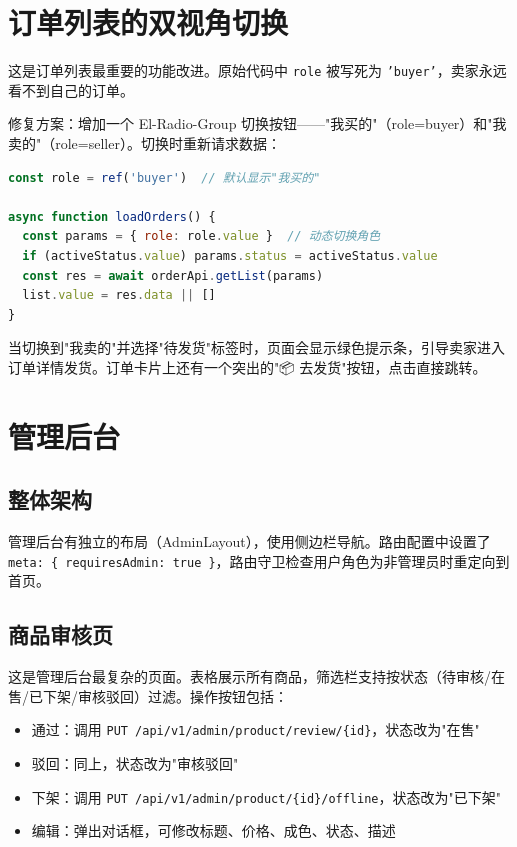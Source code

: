 \documentclass[12pt,a4paper]{ctexart}
\begin{document}
\section{订单列表的双视角切换}

这是订单列表最重要的功能改进。原始代码中 \texttt{role} 被写死为 \texttt{'buyer'}，卖家永远看不到自己的订单。

修复方案：增加一个 El-Radio-Group 切换按钮——"我买的"（role=buyer）和"我卖的"（role=seller）。切换时重新请求数据：

\begin{lstlisting}[language=JavaScript]
const role = ref('buyer')  // 默认显示"我买的"

async function loadOrders() {
  const params = { role: role.value }  // 动态切换角色
  if (activeStatus.value) params.status = activeStatus.value
  const res = await orderApi.getList(params)
  list.value = res.data || []
}
\end{lstlisting}

当切换到"我卖的"并选择"待发货"标签时，页面会显示绿色提示条，引导卖家进入订单详情发货。订单卡片上还有一个突出的"📦 去发货"按钮，点击直接跳转。

\section{管理后台}

\subsection{整体架构}

管理后台有独立的布局（AdminLayout），使用侧边栏导航。路由配置中设置了 \texttt{meta: \{ requiresAdmin: true \}}，路由守卫检查用户角色为非管理员时重定向到首页。

\subsection{商品审核页}

这是管理后台最复杂的页面。表格展示所有商品，筛选栏支持按状态（待审核/在售/已下架/审核驳回）过滤。操作按钮包括：
\begin{itemize}
  \item 通过：调用 \texttt{PUT /api/v1/admin/product/review/\{id\}}，状态改为"在售"
  \item 驳回：同上，状态改为"审核驳回"
  \item 下架：调用 \texttt{PUT /api/v1/admin/product/\{id\}/offline}，状态改为"已下架"
  \item 编辑：弹出对话框，可修改标题、价格、成色、状态、描述
\end{itemize}
\end{document}
